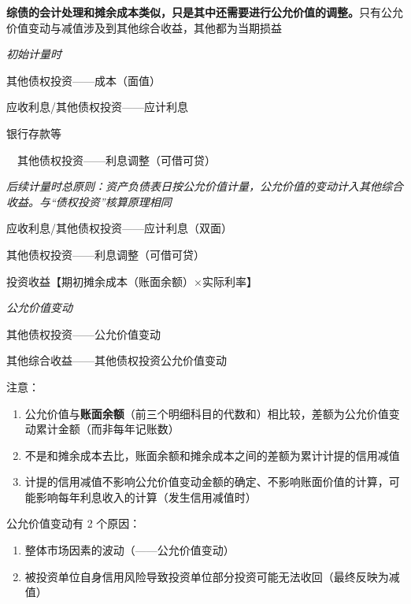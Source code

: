 \documentclass[UTF8,12pt]{ctexart}
\newenvironment{Dr}{%
	\begin{list}{}%
		{
			\setlength{\leftmargin}{2em}
			\setlength{\labelwidth}{2em}
			\setlength{\labelsep}{0pt}
			\setlength{\itemindent}{0pt}
			\setlength{\listparindent}{0pt}
			\setlength{\parsep}{0pt}
			\setlength{\topsep}{0pt}
		}
		\item[\textbf{借：}]
	}{%
	\end{list}
}
\newenvironment{Cr}{%
	\begin{list}{}%
		{
			\setlength{\leftmargin}{2em}
			\setlength{\labelwidth}{2em}
			\setlength{\labelsep}{0pt}
			\setlength{\itemindent}{0pt}
			\setlength{\listparindent}{0pt}
			\setlength{\parsep}{0pt}
			\setlength{\topsep}{0pt}
		}
		\item[\textbf{贷：}]
	}{%
	\end{list}
}
\numberwithin{equation}{section} %
\numberwithin{figure}{section}
\numberwithin{table}{section}
\begin{document}
	\textbf{综债的会计处理和摊余成本类似，只是其中还需要进行公允价值的调整。}只有公允价值变动与减值涉及到其他综合收益，其他都为当期损益
	
	\textit{初始计量时}
	
	\begin{Dr}
		其他债权投资——成本（面值）
		
		应收利息/其他债权投资——应计利息
	\end{Dr}
	\begin{Cr}
		银行存款等
		
		\ \ 其他债权投资——利息调整（可借可贷）
	\end{Cr}

	
	
	\textit{后续计量时总原则：资产负债表日按公允价值计量，公允价值的变动计入其他综合收益。与“债权投资”核算原理相同}
	
	\begin{Dr}
		应收利息/其他债权投资——应计利息（双面）
		
		其他债权投资——利息调整（可借可贷）
	\end{Dr}
	\begin{Cr}
		投资收益【期初摊余成本（账面余额）×实际利率】
	\end{Cr}

	\textit{公允价值变动}
	
	\begin{Dr}
		其他债权投资——公允价值变动
	\end{Dr}
	\begin{Cr}
		其他综合收益——其他债权投资公允价值变动
	\end{Cr}
	
	注意：
	\begin{enumerate}
		\item 公允价值与\textbf{账面余额}（前三个明细科目的代数和）相比较，差额为公允价值变动累计金额（而非每年记账数）
		
		\item 不是和摊余成本去比，账面余额和摊余成本之间的差额为累计计提的信用减值
		
		\item 计提的信用减值不影响公允价值变动金额的确定、不影响账面价值的计算，可能影响每年利息收入的计算（发生信用减值时）
	\end{enumerate}
	
	
	
	公允价值变动有 2 个原因：
	\begin{enumerate}
		\item 整体市场因素的波动（——公允价值变动）
		
		\item 被投资单位自身信用风险导致投资单位部分投资可能无法收回（最终反映为减值）
	\end{enumerate}
	
\end{document}
